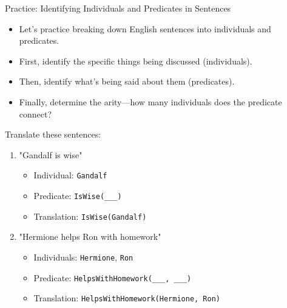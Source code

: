 \documentclass{beamer}
\begin{document}
	\begin{frame}{Practice: Identifying Individuals and Predicates in Sentences}
		\begin{itemize}
			\item Let's practice breaking down English sentences into individuals and predicates.
			\item First, identify the specific things being discussed (individuals).
			\item Then, identify what's being said about them (predicates).
			\item Finally, determine the arity—how many individuals does the predicate connect?
		\end{itemize}
		
		\begin{example}
			
			Translate these sentences:
			\begin{enumerate}
				\small
				\item "Gandalf is wise" 
				\begin{itemize}
					\scriptsize
					\item Individual: \texttt{Gandalf}
					\item Predicate: \texttt{IsWise(\_\_\_)}
					\item Translation: \texttt{IsWise(Gandalf)}
				\end{itemize}
				\item "Hermione helps Ron with homework"
				\begin{itemize}
					\scriptsize
					\item Individuals: \texttt{Hermione}, \texttt{Ron}  
					\item Predicate: \texttt{HelpsWithHomework(\_\_\_, \_\_\_)}
					\item Translation: \texttt{HelpsWithHomework(Hermione, Ron)}
				\end{itemize}
			\end{enumerate}
		\end{example}
	\end{frame}
\end{document}
